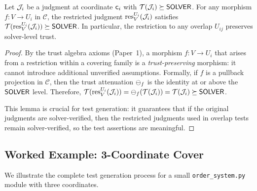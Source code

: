 \documentclass[11pt]{article}
\begin{document}
\begin{lemma}\label{lem:restriction-mono}
Let $\mathcal{J}_i$ be a judgment at coordinate $\mathsf{c}_i$ with
$\mathcal{T}(\mathcal{J}_i) \succeq \mathsf{SOLVER}$.  For any morphism $f : V \to U_i$
in $\mathcal{C}$, the restricted judgment $\mathrm{res}_V^{U_i}(\mathcal{J}_i)$
satisfies $\mathcal{T}(\mathrm{res}_V^{U_i}(\mathcal{J}_i)) \succeq \mathsf{SOLVER}$.
In particular, the restriction to any overlap $U_{ij}$ preserves
solver-level trust.
\end{lemma}

\begin{proof}
By the trust algebra axioms (Paper~1), a morphism $f : V \to U_i$ that
arises from a restriction within a covering family is a \emph{trust-preserving}
morphism: it cannot introduce additional unverified assumptions.  Formally,
if $f$ is a pullback projection in $\mathcal{C}$, then the trust attenuation
$\ominus_f$ is the identity at or above the $\mathsf{SOLVER}$ level.  Therefore,
$\mathcal{T}(\mathrm{res}_V^{U_i}(\mathcal{J}_i)) = \ominus_f(\mathcal{T}(\mathcal{J}_i)) = \mathcal{T}(\mathcal{J}_i)
\succeq \mathsf{SOLVER}$.

This lemma is crucial for test generation: it guarantees that if the
original judgments are solver-verified, then the restricted judgments
used in overlap tests remain solver-verified, so the test assertions
are meaningful.
\end{proof}

\subsection{Worked Example: 3-Coordinate Cover}\label{sec:cover-example}

We illustrate the complete test generation process for a small
\texttt{order\_system.py} module with three coordinates.
\end{document}
